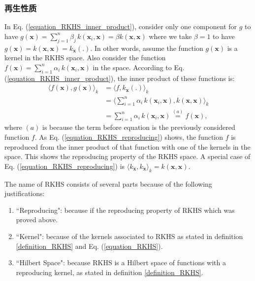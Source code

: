 \documentclass[lang=cn,10pt]{gorgeousnbook}
\numberwithin{equation}{section}%
\numberwithin{figure}{section}%
\begin{document}
\subsubsection{再生性质}

In Eq. (\ref{equation_RKHS_inner_product}), consider only one component for $g$ to have $g(\boldsymbol{x}) = \sum_{j=1}^n \beta_j\, k(\boldsymbol{x}_i, \boldsymbol{x}) = \beta k(\boldsymbol{x}, \boldsymbol{x})$ where we take $\beta = 1$ to have $g(\boldsymbol{x}) = k(\boldsymbol{x}, \boldsymbol{x}) = k_{\boldsymbol{x}}(.)$. 
In other words, assume the function $g(\boldsymbol{x})$ is a kernel in the RKHS space. 
Also consider the function $f(\boldsymbol{x}) = \sum_{i=1}^n \alpha_i\, k(\boldsymbol{x}_i, \boldsymbol{x})$ in the space. According to  Eq. (\ref{equation_RKHS_inner_product}), the inner product of these functions is:
\begin{align}
\langle f(\boldsymbol{x}), g(\boldsymbol{x}) \rangle_k &= \langle f, k_{\boldsymbol{x}}(.) \rangle_k \nonumber \\
&= \Big\langle \sum_{i=1}^n \alpha_i\, k(\boldsymbol{x}_i, \boldsymbol{x}), k(\boldsymbol{x}, \boldsymbol{x}) \Big\rangle_k \nonumber \\
&= \sum_{i=1}^n \alpha_i\, k(\boldsymbol{x}_i, \boldsymbol{x}) \overset{(a)}{=} f(\boldsymbol{x}), \label{equation_RKHS_reproducing}
\end{align}
where $(a)$ is because the term before equation is the previously considered function $f$. 
As Eq. (\ref{equation_RKHS_reproducing}) shows, the function $f$ is reproduced from the inner product of that function with one of the kernels in the space. This shows the reproducing property of the RKHS space. 
A special case of Eq. (\ref{equation_RKHS_reproducing}) is $\langle k_{\boldsymbol{x}}, k_{\boldsymbol{x}} \rangle_k = k(\boldsymbol{x}, \boldsymbol{x})$. 

The name of RKHS consists of several parts because of the following justifications:
\begin{enumerate}
\item ``Reproducing": because if the reproducing property of RKHS which was proved above. 
\item ``Kernel": because of the kernels associated to RKHS as stated in definition \ref{definition_RKHS} and Eq. (\ref{equation_RKHS}). 
\item ``Hilbert Space": because RKHS is a Hilbert space of functions with a reproducing kernel, as stated in definition \ref{definition_RKHS}.
\end{enumerate}
\end{document}
